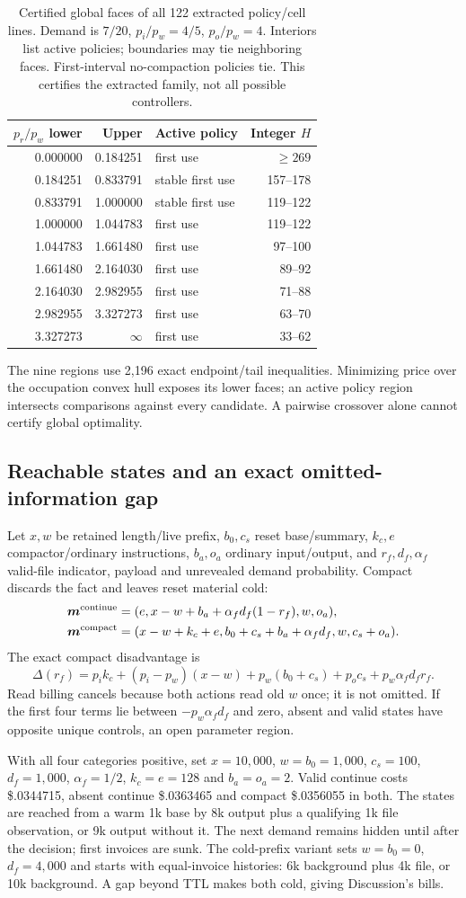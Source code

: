 \documentclass[sigconf,screen,nonacm]{acmart}
\makeatletter
\newcommand{\Mvec}{\boldsymbol{m}}
\newcommand{\PaperPriceFaces}{%
\begin{tabular}{@{}rrlr@{}}\toprule
$p_r/p_w$ lower & Upper & Active policy & Integer $H$\\\midrule
0.000000 & 0.184251 & first use & $\ge269$\\
0.184251 & 0.833791 & stable first use & 157--178\\
0.833791 & 1.000000 & stable first use & 119--122\\
1.000000 & 1.044783 & first use & 119--122\\
1.044783 & 1.661480 & first use & 97--100\\
1.661480 & 2.164030 & first use & 89--92\\
2.164030 & 2.982955 & first use & 71--88\\
2.982955 & 3.327273 & first use & 63--70\\
3.327273 & $\infty$ & first use & 33--62\\\bottomrule
\end{tabular}}
\makeatother
\begin{document}
\begin{table}[t]
\centering\small
\caption{Certified global faces of all 122 extracted policy/cell lines.
Demand is $7/20$, $p_i/p_w=4/5$, $p_o/p_w=4$. Interiors list active
policies; boundaries may tie neighboring faces. First-interval no-compaction
policies tie. This certifies the extracted family, not all possible controllers.}
\label{tab:price-faces}\PaperPriceFaces
\end{table}

The nine regions use 2,196 exact endpoint/tail inequalities. Minimizing
price over the occupation convex hull exposes its lower faces; an active
policy region intersects comparisons against every candidate. A pairwise
crossover alone cannot certify global optimality.

\subsection{Reachable states and an exact omitted-information gap}
Let $x,w$ be retained length/live prefix, $b_0,c_s$ reset base/summary,
$k_c,e$ compactor/ordinary instructions, $b_a,o_a$ ordinary input/output,
and $r_f,d_f,\alpha_f$ valid-file indicator, payload and unrevealed demand
probability. Compact discards the fact and leaves reset material cold:
\begin{align}
\Mvec^{\rm continue}&=(e,x-w+b_a+\alpha_fd_f(1-r_f),w,o_a),\\
\Mvec^{\rm compact}&=(x-w+k_c+e,b_0+c_s+b_a+\alpha_fd_f,w,c_s+o_a).
\end{align}
The exact compact disadvantage is
\begin{equation}
\Delta(r_f)=p_i k_c+(p_i-p_w)(x-w)+p_w(b_0+c_s)+p_oc_s
+p_w\alpha_fd_fr_f.
\end{equation}
Read billing cancels because both actions read old $w$ once; it is not
omitted. If the first four terms lie between $-p_w\alpha_fd_f$ and
zero, absent and valid states have opposite unique controls, an open
parameter region.

With all four categories positive, set $x=10,000$, $w=b_0=1,000$,
$c_s=100$, $d_f=1,000$, $\alpha_f=1/2$, $k_c=e=128$ and $b_a=o_a=2$.
Valid continue costs \$.0344715, absent continue \$.0363465 and compact
\$.0356055 in both. The states are reached from a warm 1k base by
8k output plus a qualifying 1k file observation, or 9k output without it.
The next demand remains hidden until after the decision; first invoices
are sunk. The cold-prefix variant sets $w=b_0=0$, $d_f=4,000$ and
starts with equal-invoice histories: 6k background plus 4k file, or 10k
background. A gap beyond TTL makes both cold, giving Discussion's bills.
\end{document}
